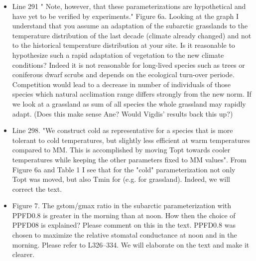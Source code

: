 \documentclass{scrartcl}
\begin{document}
\begin{itemize}
\item {\color{blue}Line 291 " Note, however, that these parameterizations are hypothetical and have yet to be verified by experiments." Figure 6a.  Looking at the graph I understand that you assume an adaptation of the subarctic grasslands to the temperature distribution of the last decade (climate already changed) and not to the historical temperature distribution at your site. Is it reasonable to hypothesize such a rapid adaptation of vegetation to the new climate conditions?} Indeed it is not reasonable for long-lived species such as trees or coniferous dwarf scrubs and depends on the ecological turn-over periode. Competition would lead to a decrease in number of individuals of those species which natural acclimation range differs strongly from the new norm. If we look at a grassland as sum of all species the whole grassland may rapidly adapt. (Does this make sense Ane? Would Vigdis' results back this up?) 

\item {\color{blue}Line 298. "We construct cold as representative for a species that is more tolerant to cold temperatures, but slightly less efficient at warm temperatures compared to MM. This is accomplished by moving Topt towards cooler temperatures while keeping the other parameters fixed to MM values".
From Figure 6a and Table 1 I see that for the "cold" parameterization not only Topt was moved, but also Tmin for (e.g. for grassland).}
Indeed, we will correct the text.

\item {\color{blue}Figure 7. The gstom/gmax ratio in the subarctic parameterization with PPFD0.8 is greater in the morning than at noon. How then the choice of PPFD08 is explained? Please comment on this in the text.}
PPFD0.8 was chosen to maximize the relative stomatal conductance at noon and in the morning. Please refer to L326--334. We will elaborate on the text and make it clearer. 


\end{itemize}
\end{document}
